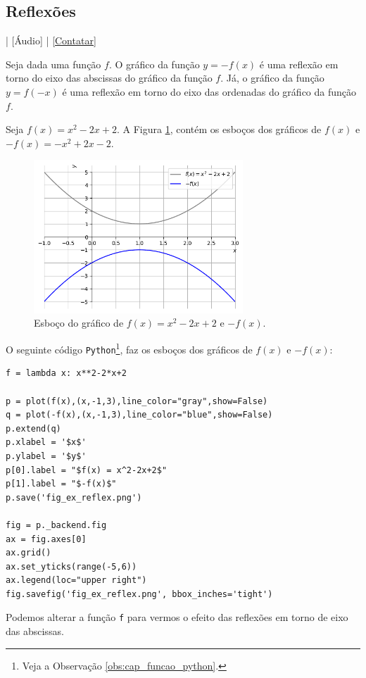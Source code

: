 \subsection{Reflexões}

\begin{flushright}
  [Vídeo] | [Áudio] | \href{https://phkonzen.github.io/notas/contato.html}{[Contatar]}
\end{flushright}

Seja dada uma função $f$. O gráfico da função $y = -f(x)$ é uma reflexão em torno do eixo das abscissas do gráfico da função $f$. Já, o gráfico da função $y = f(-x)$ é uma reflexão em torno do eixo das ordenadas do gráfico da função $f$.

\begin{ex}
  Seja $f(x) = x^2-2x+2$. A Figura \ref{fig:ex_reflex}, contém os esboços dos gráficos de $f(x)$ e $-f(x) = -x^2+2x-2$.

  \begin{figure}[H]
    \centering
    \includegraphics[width=0.7\textwidth]{./cap_funcao/dados/fig_ex_reflex/fig_ex_reflex}
    \caption{Esboço do gráfico de $f(x) = x^2-2x+2$ e $-f(x)$.}
    \label{fig:ex_reflex}
  \end{figure}

  \ifispython
  O seguinte código \verb+Python+\footnote{Veja a Observação \ref{obs:cap_funcao_python}.}, faz os esboços dos gráficos de $f(x)$ e $-f(x)$:
\begin{verbatim}
f = lambda x: x**2-2*x+2

p = plot(f(x),(x,-1,3),line_color="gray",show=False)
q = plot(-f(x),(x,-1,3),line_color="blue",show=False)
p.extend(q)
p.xlabel = '$x$'
p.ylabel = '$y$'
p[0].label = "$f(x) = x^2-2x+2$"
p[1].label = "$-f(x)$"
p.save('fig_ex_reflex.png')

fig = p._backend.fig
ax = fig.axes[0]
ax.grid()
ax.set_yticks(range(-5,6))
ax.legend(loc="upper right")
fig.savefig('fig_ex_reflex.png', bbox_inches='tight')
\end{verbatim}
  Podemos alterar a função \verb+f+ para vermos o efeito das reflexões em torno de eixo das abscissas.
  \fi
\end{ex}


